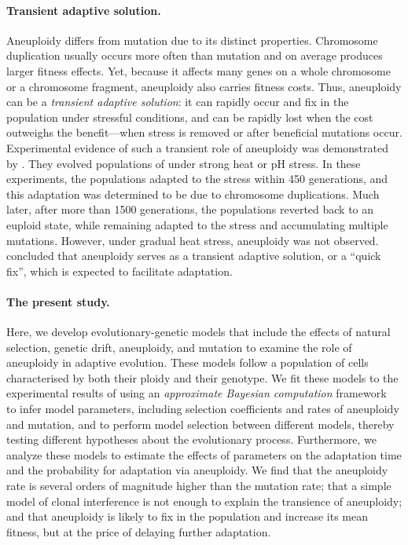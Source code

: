 \documentclass[12pt]{extarticle}
\begin{document}
\paragraph*{Transient adaptive solution.} 
Aneuploidy differs from mutation due to its distinct properties. 
Chromosome duplication usually occurs more often than mutation and on average produces larger fitness effects.
Yet, because it affects many genes on a whole chromosome or a chromosome fragment, aneuploidy also carries fitness costs.
Thus, aneuploidy can be a \emph{transient adaptive solution}: it can rapidly occur and fix in the population under stressful conditions, and can be rapidly lost when the cost outweighs the benefit---when stress is removed or after beneficial mutations occur.
Experimental evidence of such a transient role of aneuploidy was demonstrated by \citet{Yona2012}. They evolved populations of \yeast under strong heat or pH stress.
In these experiments, the populations adapted to the stress within 450 generations, and this adaptation was determined to be due to chromosome duplications.
Much later, after more than 1500 generations, the populations reverted back to an euploid state, while remaining adapted to the stress and accumulating multiple mutations.
However, under gradual heat stress, aneuploidy was not observed.
\citet{Yona2012} concluded that aneuploidy serves as a transient adaptive solution, or a ``quick fix'', which is expected to facilitate adaptation. 

\paragraph*{The present study.}
Here, we develop evolutionary-genetic models that include the effects of natural selection, genetic drift, aneuploidy, and mutation to examine the role of aneuploidy in adaptive evolution.
These models follow a population of cells characterised by both their ploidy and their genotype.
We fit these models to the experimental results of \citet{Yona2012} using an \emph{approximate Bayesian computation} framework~\citep{Sisson2009, Klinger2018} to infer model parameters, including selection coefficients and rates of aneuploidy and mutation, and to perform model selection between different models, thereby testing different hypotheses about the evolutionary process.
Furthermore, we analyze these models to estimate the effects of parameters on the adaptation time and the probability for adaptation via aneuploidy.
We find that %
the aneuploidy rate is several orders of magnitude higher than the mutation rate; that a simple model of clonal interference is not enough to explain the transience of aneuploidy; %
and that aneuploidy is likely to fix in the population and increase its mean fitness, but at the price of delaying further adaptation.
\end{document}
